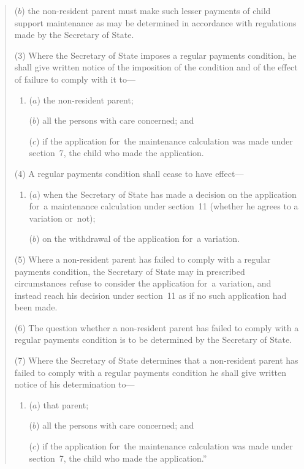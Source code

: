 \documentclass[12pt,a4paper]{article}
\begin{document}
\begin{quotation}
\begin{enumerate}
($b$) the non-resident parent must make such lesser payments of child support maintenance as may be determined in accordance with regulations made by the Secretary of State.
\end{enumerate}

(3) Where the Secretary of State imposes a regular payments condition, he shall give written notice of the imposition of the condition and of the effect of failure to comply with it to—
\begin{enumerate}\item[]
($a$) the non-resident parent;

($b$) all the persons with care concerned; and

($c$) if the application for~the maintenance calculation was made under section~7, the child who made the application.
\end{enumerate}

(4) A regular payments condition shall cease to have effect—
\begin{enumerate}\item[]
($a$) when the Secretary of State has made a decision on the application for~a maintenance calculation under section~11 (whether he agrees to a variation or~not);

($b$) on the withdrawal of the application for~a variation.
\end{enumerate}

(5) Where a non-resident parent has failed to comply with a regular payments condition, the Secretary of State may in prescribed circumstances refuse to consider the application for~a variation, and instead reach his decision under section~11 as if no such application had been made.

(6) The question whether a non-resident parent has failed to comply with a regular payments condition is to be determined by the Secretary of State.

(7) Where the Secretary of State determines that a non-resident parent has failed to comply with a regular payments condition he shall give written notice of his determination to—
\begin{enumerate}\item[]
($a$) that parent;

($b$) all the persons with care concerned; and

($c$) if the application for~the maintenance calculation was made under section~7, the child who made the application.”
\end{enumerate}
\end{quotation}
\end{document}
